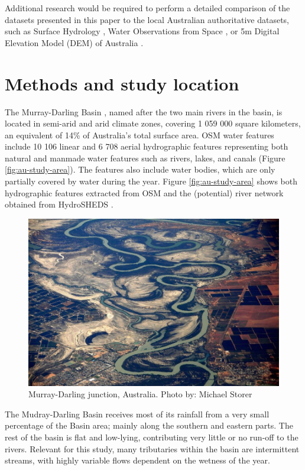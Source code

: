 Additional research would be required to perform a detailed comparison of the datasets presented in this paper to the local Australian authoritative datasets, such as Surface Hydrology \citep{CrossmanSLi2015}, Water Observations from Space \citep{Mueller2015}, or 5m Digital Elevation Model (DEM) of Australia \citep{dataAUDEM5m}.

\section{Methods and study location}
The Murray-Darling Basin \citep{webMurrayDarlingAuthority}, named after the two main rivers in the basin, is located in semi-arid and arid climate zones, covering 1 059 000 square kilometers, an equivalent of 14\% of Australia’s total surface area. OSM water features include 10 106 linear and 6 708 aerial hydrographic features representing both natural and manmade water features such as rivers, lakes, and canals (Figure \ref{fig:au-study-area}). The features also include water bodies, which are only partially covered by water during the year. Figure \ref{fig:au-study-area} shows both hydrographic features extracted from OSM and the (potential) river network obtained from HydroSHEDS \citep{Lehner2008}. 

\begin{figure}[H]
	\centering
	\includegraphics[width=1\textwidth]{01.9-water-murray-darling/figures/water_Murray-Darling-junction}
	\caption{Murray-Darling junction, Australia. Photo by: Michael Storer}
\end{figure}


The Mudray-Darling Basin receives most of its rainfall from a very small percentage of the Basin area; mainly along the southern and eastern parts. The rest of the basin is flat and low-lying, contributing very little or no run-off to the rivers. Relevant for this study, many tributaries within the basin are intermittent streams, with highly variable flows dependent on the wetness of the year.

